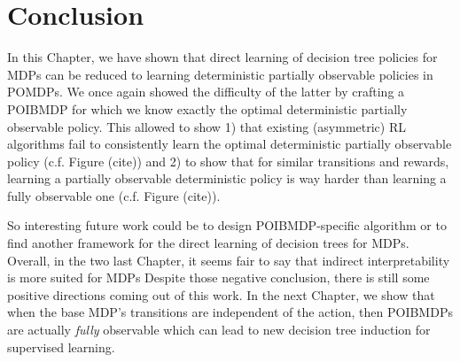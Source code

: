 \section{Conclusion}
In this Chapter, we have shown that direct learning of decision tree policies for MDPs can be reduced to learning deterministic partially observable policies in POMDPs. 
We once again showed the difficulty of the latter by crafting a POIBMDP for which we know exactly the optimal deterministic partially observable policy.
This allowed to show 1) that existing (asymmetric) RL algorithms fail to consistently learn the optimal deterministic partially observable policy (c.f. Figure (cite)) and 2) to show that for similar transitions and rewards, learning a partially observable deterministic policy is way harder than learning a fully observable one (c.f. Figure (cite)).

So interesting future work could be to design POIBMDP-specific algorithm or to find another framework for the direct learning of decision trees for MDPs.
Overall, in the two last Chapter, it seems fair to say that indirect interpretability is more suited for MDPs
Despite those negative conclusion, there is still some positive directions coming out of this work.
In the next Chapter, we show that when the base MDP's transitions are independent of the action, then POIBMDPs are actually \textit{fully} observable which can lead to new decision tree induction for supervised learning.
